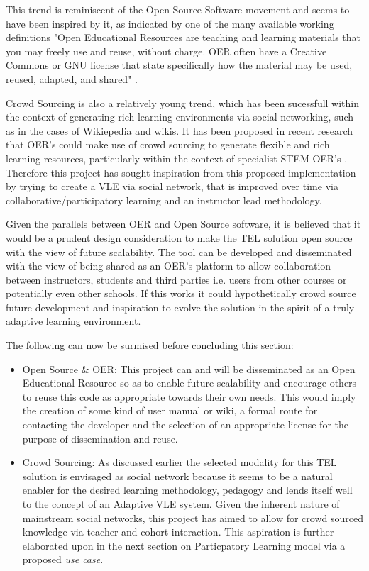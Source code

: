 \begin{itemize}[\null]
    This trend is reminiscent of the Open Source Software movement and seems to have been inspired by it, as indicated by one of the many available working definitions "Open Educational Resources are teaching and learning materials that you may freely use and reuse, without charge. OER often have a Creative Commons or GNU license that state specifically how the material may be used, reused, adapted, and shared" \cite{CreativeCommons}.
    
    Crowd Sourcing is also a relatively young trend, which has been sucessfull within the context of generating rich learning environments via social networking, such as in the cases of Wikiepedia and wikis. It has been proposed in recent research that OER's could make use of crowd sourcing to generate flexible and rich learning resources, particularly within the context of specialist STEM OER's \cite{Hills2015,Estelles-Arolas2012}. Therefore this project has sought inspiration from this proposed implementation by trying to create a VLE via social network, that is improved over time via collaborative/participatory learning and an instructor lead methodology.
    
    Given the parallels between  OER and Open Source software, it is believed that it would be a prudent design consideration to make the TEL solution open source with the view of future scalability. The tool can be developed and disseminated with the view of being shared as an OER's platform to allow collaboration between instructors, students and third parties i.e. users from other courses or potentially even other schools. If this works it could hypothetically crowd source future development and inspiration to evolve the solution in the spirit of a truly adaptive learning environment.
    
    
    The following can now be surmised before concluding this section:
    \begin{itemize}
        \item Open Source \& OER: This project can and  will be disseminated as an Open Educational Resource so as to enable future scalability and encourage others to reuse this code as appropriate towards their own needs. This would imply the creation of some kind of user manual or wiki, a formal route for contacting the developer and the selection of an appropriate license for the purpose of dissemination and reuse.
        
        \item Crowd Sourcing: As discussed earlier the selected modality for this TEL solution is envisaged as social network because it seems to be a natural enabler for the desired learning methodology, pedagogy and lends itself well to the concept of an Adaptive VLE system. Given the inherent nature of mainstream social networks, this project has aimed to allow for crowd sourced knowledge via teacher and cohort interaction. This aspiration is further elaborated upon in the next section on Particpatory Learning model via a proposed \textit{use case}.
    \end{itemize}
    

\end{itemize}
